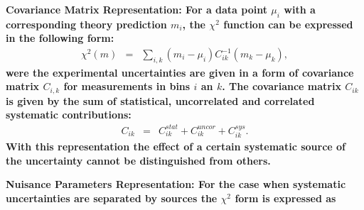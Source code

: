 \begin{description}
\item \bf {Covariance Matrix Representation:} \rm
For a data point $\mu_i$ with a corresponding theory prediction $m_i$, 
the $\chi^2$ function 
can be expressed in the following form:
%
\begin{eqnarray}
\chi^2 (m)& = & \sum_{i,k}(m_i-\mu_i)C^{-1}_{ik}(m_k-\mu_k),
\end{eqnarray}
were the experimental uncertainties are given in a form of covariance matrix $C_{i,k}$ for measurements in bins $i$ an $k$.
The covariance matrix $C_{ik}$ is given by the sum of statistical, uncorrelated and correlated systematic contributions: 
\begin{eqnarray}
C_{ik}& = & C^{stat}_{ik}+C^{uncor}_{ik}+C^{sys}_{ik}.
\end{eqnarray}
With this representation the effect of a certain systematic source of the uncertainty 
cannot be distinguished from others.

\item \bf{Nuisance Parameters Representation:} \rm
For the case when systematic uncertainties are separated by sources
the $\chi^2$ form is expressed as
\label{sec:nuisance_representation}


\end{description}
